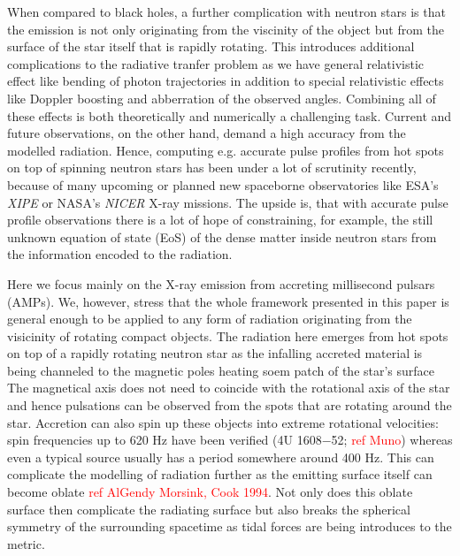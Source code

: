 \documentclass[iop, usenatbib]{emulateapj}
\newcommand{\red}[1]{\textcolor{red}{#1}}
\begin{document}
When compared to black holes, a further complication with neutron stars is that the emission is not only originating from the viscinity of the object but from the surface of the star itself that is rapidly rotating.
This introduces additional complications to the radiative tranfer problem as we have general relativistic effect like bending of photon trajectories in addition to special relativistic effects like Doppler boosting and abberration of the observed angles.
Combining all of these effects is both theoretically and numerically a challenging task.
Current and future observations, on the other hand, demand a high accuracy from the modelled radiation.
Hence, computing e.g. accurate pulse profiles from hot spots on top of spinning neutron stars has been under a lot of scrutinity recently, because of many upcoming or planned new spaceborne observatories like ESA's \textit{XIPE} or NASA's \textit{NICER} X-ray missions.
The upside is, that with accurate pulse profile observations there is a lot of hope of constraining, for example, the still unknown equation of state (EoS) of the dense matter inside neutron stars from the information encoded to the radiation.

Here we focus mainly on the X-ray emission from accreting millisecond pulsars (AMPs).
We, however, stress that the whole framework presented in this paper is general enough to be applied to any form of radiation originating from the visicinity of rotating compact objects. %
The radiation here emerges from hot spots on top of a rapidly rotating neutron star as the infalling accreted material is being channeled to the magnetic poles heating soem patch of the star's surface
The magnetical axis does not need to coincide with the rotational axis of the star and hence pulsations can be observed from the spots that are rotating around the star.
Accretion can also spin up these objects into extreme rotational velocities: spin frequencies up to 620 Hz have been verified (4U 1608$-$52; \red{ref Muno}) whereas even a typical source usually has a period somewhere around 400 Hz.
This can complicate the modelling of radiation further as the emitting surface itself can become oblate \red{ref AlGendy Morsink, Cook 1994}.
Not only does this oblate surface then complicate the radiating surface but also breaks the spherical symmetry of the surrounding spacetime as tidal forces are being introduces to the metric.




\end{document}
